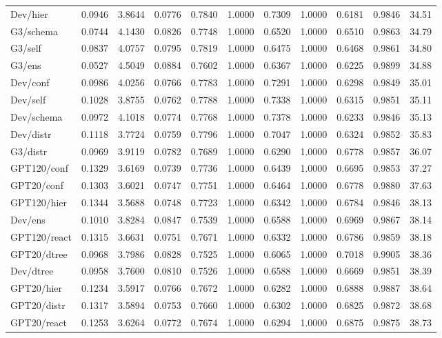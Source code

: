 \begin{table}[t]
\begin{tabular}{lrrrrrrrrrr}
Dev/hier & 0.0946 & 3.8644 & 0.0776 & 0.7840 & 1.0000 & 0.7309 & 1.0000 & 0.6181 & 0.9846 & 34.51 \\
G3/schema & 0.0744 & 4.1430 & 0.0826 & 0.7748 & 1.0000 & 0.6520 & 1.0000 & 0.6510 & 0.9863 & 34.79 \\
G3/self & 0.0837 & 4.0757 & 0.0795 & 0.7819 & 1.0000 & 0.6475 & 1.0000 & 0.6468 & 0.9861 & 34.80 \\
G3/ens & 0.0527 & 4.5049 & 0.0884 & 0.7602 & 1.0000 & 0.6367 & 1.0000 & 0.6225 & 0.9899 & 34.88 \\
Dev/conf & 0.0986 & 4.0256 & 0.0766 & 0.7783 & 1.0000 & 0.7291 & 1.0000 & 0.6298 & 0.9849 & 35.01 \\
Dev/self & 0.1028 & 3.8755 & 0.0762 & 0.7788 & 1.0000 & 0.7338 & 1.0000 & 0.6315 & 0.9851 & 35.11 \\
Dev/schema & 0.0972 & 4.1018 & 0.0774 & 0.7768 & 1.0000 & 0.7378 & 1.0000 & 0.6233 & 0.9846 & 35.13 \\
Dev/distr & 0.1118 & 3.7724 & 0.0759 & 0.7796 & 1.0000 & 0.7047 & 1.0000 & 0.6324 & 0.9852 & 35.83 \\
G3/distr & 0.0969 & 3.9119 & 0.0782 & 0.7689 & 1.0000 & 0.6290 & 1.0000 & 0.6778 & 0.9857 & 36.07 \\
GPT120/conf & 0.1329 & 3.6169 & 0.0739 & 0.7736 & 1.0000 & 0.6439 & 1.0000 & 0.6695 & 0.9853 & 37.27 \\
GPT20/conf & 0.1303 & 3.6021 & 0.0747 & 0.7751 & 1.0000 & 0.6464 & 1.0000 & 0.6778 & 0.9880 & 37.63 \\
GPT120/hier & 0.1344 & 3.5688 & 0.0748 & 0.7723 & 1.0000 & 0.6342 & 1.0000 & 0.6784 & 0.9846 & 38.13 \\
Dev/ens & 0.1010 & 3.8284 & 0.0847 & 0.7539 & 1.0000 & 0.6588 & 1.0000 & 0.6969 & 0.9867 & 38.14 \\
GPT120/react & 0.1315 & 3.6631 & 0.0751 & 0.7671 & 1.0000 & 0.6332 & 1.0000 & 0.6786 & 0.9859 & 38.18 \\
GPT20/dtree & 0.0968 & 3.7986 & 0.0828 & 0.7525 & 1.0000 & 0.6065 & 1.0000 & 0.7018 & 0.9905 & 38.36 \\
Dev/dtree & 0.0958 & 3.7600 & 0.0810 & 0.7526 & 1.0000 & 0.6588 & 1.0000 & 0.6669 & 0.9851 & 38.39 \\
GPT20/hier & 0.1234 & 3.5917 & 0.0766 & 0.7672 & 1.0000 & 0.6282 & 1.0000 & 0.6888 & 0.9887 & 38.64 \\
GPT20/distr & 0.1317 & 3.5894 & 0.0753 & 0.7660 & 1.0000 & 0.6302 & 1.0000 & 0.6825 & 0.9872 & 38.68 \\
GPT20/react & 0.1253 & 3.6264 & 0.0772 & 0.7674 & 1.0000 & 0.6294 & 1.0000 & 0.6875 & 0.9875 & 38.73 \\

\end{tabular}
\end{table}
